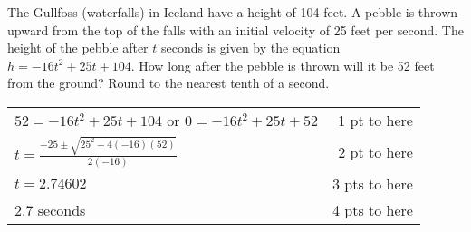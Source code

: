
{
	The Gullfoss (waterfalls) in Iceland have a height of 104 feet. A pebble is thrown upward from the top of the falls with an initial velocity of 25 feet per second. The height of the pebble after $t$ seconds is given by the equation $h=−16t^2+25t+104$. How long after the pebble is thrown will it be 52 feet from the ground? Round to the nearest tenth of a second.
}
{
	\begin{tabular}{l r}
	$52=-16t^2+25t+104$ or $0=-16t^2+25t+52$ & 1 pt to here\\
	$t=\frac{-25 \pm \sqrt{25^2-4(-16)(52)}}{2(-16)}$ & 2 pt to here\\
	$t=2.74602$ &  3 pts to here\\
	$2.7$ seconds & 4 pts to here\\
	\end{tabular}
}
